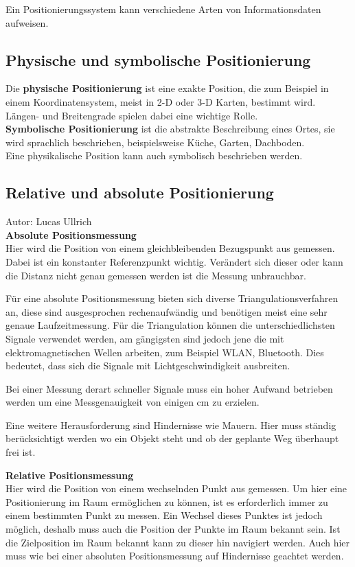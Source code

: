     Ein Positionierungssystem kann verschiedene Arten von Informationsdaten aufweisen. \cite{pos_eigenschaften}

    \subsection*{Physische und symbolische Positionierung}
    Die \textbf{physische Positionierung} ist eine exakte Position, die zum Beispiel in einem Koordinatensystem, meist in 2-D oder 3-D Karten, bestimmt wird. Längen- und Breitengrade spielen dabei eine wichtige Rolle.\\
    \textbf{Symbolische Positionierung} ist die abstrakte Beschreibung eines Ortes, sie wird sprachlich beschrieben, beispielsweise Küche, Garten, Dachboden.\\
    Eine physikalische Position kann auch symbolisch beschrieben werden.

    \subsection*{Relative und absolute Positionierung}
    Autor: Lucas Ullrich\\

    \textbf{Absolute Positionsmessung}\\
    Hier wird die Position von einem gleichbleibenden Bezugspunkt aus gemessen. Dabei ist ein konstanter Referenzpunkt wichtig.
    Verändert sich dieser oder kann die Distanz nicht genau gemessen werden ist die Messung unbrauchbar.

    Für eine absolute Positionsmessung bieten sich diverse Triangulationsverfahren an, diese sind ausgesprochen rechenaufwändig und benötigen meist eine sehr genaue Laufzeitmessung.
    Für die Triangulation können die unterschiedlichsten Signale verwendet werden, am gängigsten sind jedoch jene die mit elektromagnetischen Wellen arbeiten,
    zum Beispiel WLAN, Bluetooth. Dies bedeutet, dass sich die Signale mit Lichtgeschwindigkeit ausbreiten.

    Bei einer Messung derart schneller Signale muss ein hoher Aufwand betrieben werden um eine Messgenauigkeit von einigen cm zu erzielen.

    Eine weitere Herausforderung sind Hindernisse wie Mauern. Hier muss ständig berücksichtigt werden wo ein Objekt steht und ob der geplante Weg überhaupt frei ist.

    \textbf{Relative Positionsmessung}\\
    Hier wird die Position von einem wechselnden Punkt aus gemessen. Um hier eine Positionierung im Raum ermöglichen zu können,
    ist es erforderlich immer zu einem bestimmten Punkt zu messen. Ein Wechsel dieses Punktes ist jedoch möglich,
    deshalb muss auch die Position der Punkte im Raum bekannt sein. Ist die Zielposition im Raum bekannt kann zu dieser hin navigiert werden.
    Auch hier muss wie bei einer absoluten Positionsmessung auf Hindernisse geachtet werden.

